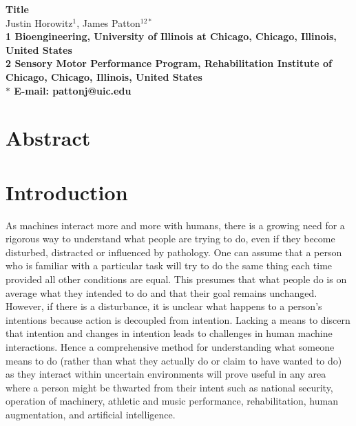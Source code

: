 \documentclass[10pt]{article}
\date{}
\begin{document}
\begin{flushleft}
{\Large
\textbf{Title}
}
\\
Justin Horowitz$^{1}$, 
James Patton$^{12\ast}$
\\
\bf{1} Bioengineering, University of Illinois at Chicago, Chicago, Illinois, United States
\\
\bf{2} Sensory Motor Performance Program, Rehabilitation Institute of Chicago, Chicago, Illinois, United States
\\
$\ast$ E-mail: pattonj@uic.edu
\end{flushleft}

\section*{Abstract}


\section*{Introduction}
As machines interact more and more with humans, there is a growing need for a rigorous way to understand what people are trying to do, even if they become disturbed, distracted or influenced by pathology. One can assume that a person who is familiar with a particular task will try to do the same thing each time provided all other conditions are equal. This presumes that what people do is on average what they intended to do and that their goal remains unchanged. However, if there is a disturbance, it is unclear what happens to a person's intentions because action is decoupled from intention. Lacking a means to discern that intention and changes in intention leads to challenges in human machine interactions. Hence a comprehensive method for understanding what someone means to do (rather than what they actually do or claim to have wanted to do) as they interact within uncertain environments will prove useful in any area where a person might be thwarted from their intent such as national security, operation of machinery, athletic and music performance, rehabilitation, human augmentation, and artificial intelligence.
\end{document}
